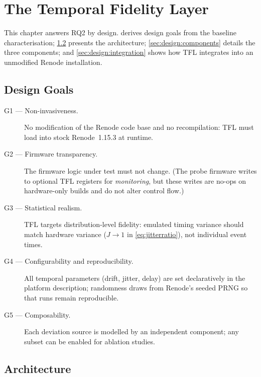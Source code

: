 \chapter{The Temporal Fidelity Layer}
\label{ch:design}

This chapter answers RQ2 by design.  derives
design goals from the baseline characterisation;
\cref{sec:design:architecture} presents the architecture;
\cref{sec:design:components} details the three components; and
\cref{sec:design:integration} shows how TFL integrates into an
unmodified Renode installation.

\section{Design Goals}
\label{sec:design:goals}

\begin{description}
  \item[G1 --- Non-invasiveness.] No modification of the Renode code
        base and no recompilation: TFL must load into stock
        Renode~1.15.3 at runtime.
  \item[G2 --- Firmware transparency.] The firmware logic under test
        must not change. (The probe firmware writes to optional TFL
        registers for \emph{monitoring}, but these writes are
        no-ops on hardware-only builds and do not alter control flow.)
  \item[G3 --- Statistical realism.] TFL targets distribution-level
        fidelity: emulated timing variance should match hardware
        variance ($J \to 1$ in \cref{eq:jitterratio}), not individual
        event times.
  \item[G4 --- Configurability and reproducibility.] All temporal
        parameters (drift, jitter, delay) are set declaratively in the
        platform description; randomness draws from Renode's seeded
        PRNG so that runs remain reproducible.
  \item[G5 --- Composability.] Each deviation source is modelled by an
        independent component; any subset can be enabled for ablation
        studies.
\end{description}

\section{Architecture}
\label{sec:design:architecture}

